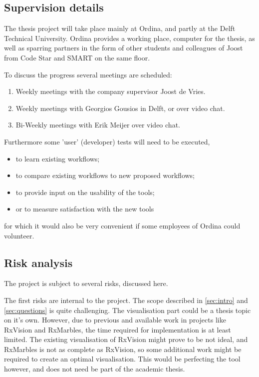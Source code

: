 \documentclass[11pt,a4paper]{article}
\begin{document}
\subsection{Supervision details}
The thesis project will take place mainly at Ordina, and partly at the Delft Technical University.
Ordina provides a working place, computer for the thesis, as well as sparring partners in the form of other students and colleagues of Joost from Code Star and SMART on the same floor.


\noindent To discuss the progress several meetings are scheduled:
\begin{enumerate}
	\item Weekly meetings with the company supervisor Joost de Vries.
	\item Weekly meetings with Georgios Gousios in Delft, or over video chat.
	\item Bi-Weekly meetings with Erik Meijer over video chat.
\end{enumerate}

\noindent Furthermore some 'user' (developer) tests will need to be executed, 
\begin{itemize}
	\item to learn existing workflows;
	\item to compare existing workflows to new proposed workflows;
	\item to provide input on the usability of the tools;
	\item or to measure satisfaction with the new tools
\end{itemize}
for which it would also be very convenient if some employees of Ordina could volunteer.

\subsection{Risk analysis}
The project is subject to several risks, discussed here. 

The first risks are internal to the project. The scope described in \autoref{sec:intro} and \ref{sec:questions} is quite challenging. The visualisation part could be a thesis topic on it's own. However, due to previous and available work in projects like RxVision and RxMarbles, the time required for implementation is at least limited. The existing visualisation of RxVision might prove to be not ideal, and RxMarbles is not as complete as RxVision, so some additional work might be required to create an optimal visualisation. This would be perfecting the tool however, and does not need be part of the academic thesis.
\end{document}
